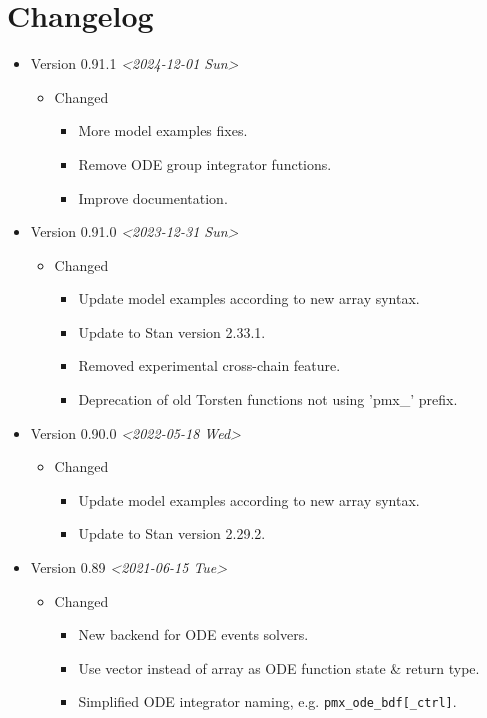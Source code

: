 \documentclass[12pt, reqno, oneside]{amsbook}
\numberwithin{equation}{chapter}
\numberwithin{figure}{chapter}
\numberwithin{table}{chapter}
\theoremstyle{remark}
\begin{document}
\chapter{Changelog}
\label{sec:org6ee814c}
\begin{itemize}
  \item Version 0.91.1 \textit{<2024-12-01 Sun>}
\begin{itemize}
\item Changed
\begin{itemize}
\item More model examples fixes.
\item Remove ODE group integrator functions.
\item Improve documentation.
\end{itemize}
\end{itemize}
\item Version 0.91.0 \textit{<2023-12-31 Sun>}
\begin{itemize}
\item Changed
\begin{itemize}
\item Update model examples according to new array syntax.
\item Update to Stan version 2.33.1.
\item Removed experimental cross-chain feature.
\item Deprecation of old Torsten functions not using 'pmx\_' prefix.
\end{itemize}
\end{itemize}
\item Version 0.90.0 \textit{<2022-05-18 Wed>}
\begin{itemize}
\item Changed
\begin{itemize}
\item Update model examples according to new array syntax.
\item Update to Stan version 2.29.2.
\end{itemize}
\end{itemize}
\item Version 0.89 \textit{<2021-06-15 Tue>}
\begin{itemize}
\item Changed
\begin{itemize}
\item New backend for ODE events solvers.
\item Use vector instead of array as ODE function state \& return type.
\item Simplified ODE integrator naming, e.g. \texttt{pmx\_ode\_bdf[\_ctrl]}.

\end{itemize}
\end{itemize}
\end{itemize}
\end{document}
